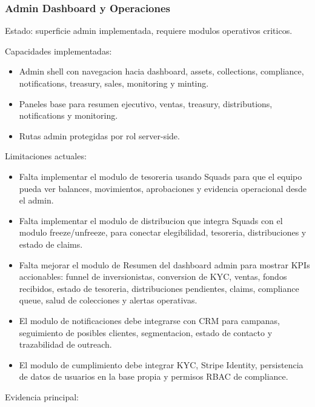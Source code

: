 \documentclass[
  10pt,
  letterpaper,
]{article}
\providecommand{\tightlist}{%
  \setlength{\itemsep}{0pt}\setlength{\parskip}{0pt}}
\begin{document}
\subsubsection{Admin Dashboard y
Operaciones}\label{admin-dashboard-y-operaciones}

Estado: superficie admin implementada, requiere modulos operativos
criticos.

Capacidades implementadas:

\begin{itemize}
\tightlist
\item
  Admin shell con navegacion hacia dashboard, assets, collections,
  compliance, notifications, treasury, sales, monitoring y minting.
\item
  Paneles base para resumen ejecutivo, ventas, treasury, distributions,
  notifications y monitoring.
\item
  Rutas admin protegidas por rol server-side.
\end{itemize}

Limitaciones actuales:

\begin{itemize}
\tightlist
\item
  Falta implementar el modulo de tesoreria usando Squads para que el
  equipo pueda ver balances, movimientos, aprobaciones y evidencia
  operacional desde el admin.
\item
  Falta implementar el modulo de distribucion que integra Squads con el
  modulo freeze/unfreeze, para conectar elegibilidad, tesoreria,
  distribuciones y estado de claims.
\item
  Falta mejorar el modulo de Resumen del dashboard admin para mostrar
  KPIs accionables: funnel de inversionistas, conversion de KYC, ventas,
  fondos recibidos, estado de tesoreria, distribuciones pendientes,
  claims, compliance queue, salud de colecciones y alertas operativas.
\item
  El modulo de notificaciones debe integrarse con CRM para campanas,
  seguimiento de posibles clientes, segmentacion, estado de contacto y
  trazabilidad de outreach.
\item
  El modulo de cumplimiento debe integrar KYC, Stripe Identity,
  persistencia de datos de usuarios en la base propia y permisos RBAC de
  compliance.
\end{itemize}

Evidencia principal:
\end{document}
